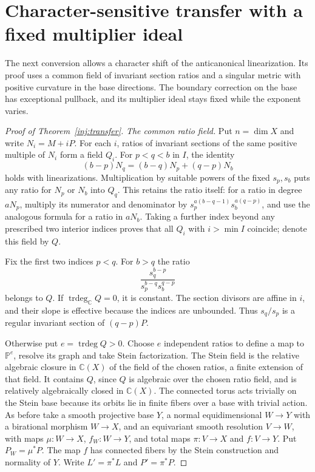 \section{Character-sensitive transfer with a fixed multiplier ideal}
\label{inj:character-transfer}

The next conversion allows a character shift of the anticanonical
linearization.  Its proof uses a common field of invariant section
ratios and a singular metric with positive curvature in the base
directions.  The boundary correction on the base has exceptional
pullback, and its multiplier ideal stays fixed while the exponent
varies.

\begin{proof}[Proof of Theorem~\ref{inj:transfer}]
\smallskip\noindent\textit{The common ratio field.} Put $n=\dim X$ and write $N_i=M+iP$.  For each $i$, ratios of invariant sections of
the same positive multiple of $N_i$ form a field $Q_i$.
For $p<q<b$ in $I$, the identity
\[
 (b-p)N_q=(b-q)N_p+(q-p)N_b
\]
holds with linearizations.  Multiplication by suitable powers of
the fixed $s_p,s_b$ puts any ratio for $N_p$ or $N_b$ into $Q_q$.
This retains the ratio itself: for a ratio in degree $aN_p$, multiply
its numerator and denominator by
$s_p^{a(b-q-1)}s_b^{a(q-p)}$, and use the analogous formula for
a ratio in $aN_b$.  Taking a further index beyond any prescribed
two interior indices proves that all $Q_i$ with $i>\min I$ coincide;
denote this field by $Q$.

Fix the first two indices $p<q$.  For $b>q$ the ratio
\begin{equation}\label{inj:ratio-field-identity}
 \frac{s_q^{b-p}}{s_p^{b-q}s_b^{q-p}}
\end{equation}
belongs to $Q$.  If $\operatorname{trdeg}_{\mathbb C}Q=0$,
it is constant.  The section divisors are affine in $i$, and their
slope is effective because the indices are unbounded.  Thus
$s_q/s_p$ is a regular invariant section of $(q-p)P$.

Otherwise put $e=\operatorname{trdeg}Q>0$.  Choose $e$ independent
ratios to define a map to $\mathbb P^e$, resolve its graph and take
Stein factorization. The Stein field is the relative algebraic closure
in $\mathbb C(X)$ of the field of the chosen ratios, a finite extension
of that field. It contains $Q$, since $Q$ is algebraic over the chosen
ratio field, and is relatively algebraically closed in $\mathbb C(X)$.
The connected torus acts
trivially on the Stein base because its orbits lie in finite fibers
over a base with trivial action.  As before take a smooth projective
base $Y$, a normal equidimensional $W\to Y$ with a birational
morphism $W\to X$, and an equivariant smooth resolution $V\to W$,
with maps $\mu:W\to X$, $f_W:W\to Y$, and total maps $\pi:V\to X$ and $f:V\to Y$. Put $P_W=\mu^*P$.  The map $f$ has
connected fibers by the Stein construction and normality of $Y$.
Write $L'=\pi^*L$ and
$P'=\pi^*P$.


\end{proof}
